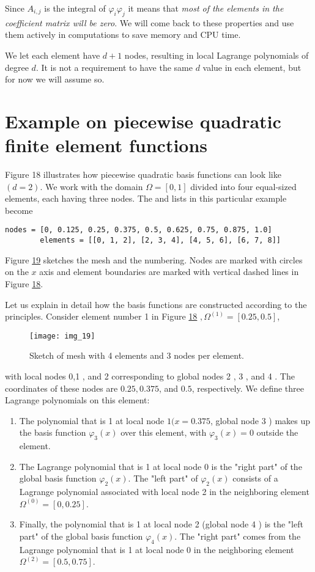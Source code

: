 \documentclass[../main.tex]{subfiles}
\begin{document}
	\noindent Since $A_{i, j}$ is the integral of $\varphi_{i} \varphi_{j}$ it means that \textit{most of the elements in the coefficient matrix will be zero}. We will come back to these properties and use them actively in computations to save memory and CPU time.
	
	We let each element have $d+1$ nodes, resulting in local Lagrange polynomials of degree $d$. It is not a requirement to have the same $d$ value in each element, but for now we will assume so.
	\section[Example on piecewise quadratic finite element functions]{Example on piecewise quadratic finite element functions}
	\label{sec:sec_3_3}
	\noindent Figure 18 illustrates how piecewise quadratic basis functions can look like $(d=2)$. We work with the domain $\Omega=[0,1]$ divided into four equal-sized elements, each having three nodes. The  and  lists in this particular example become
	\begin{lstlisting}[numbers=none]
		nodes = [0, 0.125, 0.25, 0.375, 0.5, 0.625, 0.75, 0.875, 1.0]
		elements = [[0, 1, 2], [2, 3, 4], [4, 5, 6], [6, 7, 8]]	
	\end{lstlisting}
	Figure \hyperref[fig:img_19]{19} sketches the mesh and the numbering. Nodes are marked with circles on the $x$ axis and element boundaries are marked with vertical dashed lines in Figure \hyperref[fig:img_18]{18}.
	
	Let us explain in detail how the basis functions are constructed according to the principles. Consider element number 1 in Figure \hyperref[fig:img_18]{18} $, \Omega^{(1)}=[0.25,0.5]$,
	\begin{figure}[H]
		\centering
		\texttt{[image: img\_19]}
		\caption{Sketch of mesh with 4 elements and 3 nodes per element.}
		\label{fig:img_19}
	\end{figure}
	\noindent with local nodes 0,1 , and 2 corresponding to global nodes 2 , 3 , and 4 . The coordinates of these nodes are $0.25,0.375$, and $0.5$, respectively. We define three Lagrange polynomials on this element:
	\begin{enumerate}
		\item The polynomial that is 1 at local node $1(x=0.375$, global node 3 ) makes up the basis function $\varphi_{3}(x)$ over this element, with $\varphi_{3}(x)=0$ outside the element.
		\item The Lagrange polynomial that is 1 at local node 0 is the "right part" of the global basis function $\varphi_{2}(x)$. The "left part" of $\varphi_{2}(x)$ consists of a Lagrange polynomial associated with local node 2 in the neighboring element $\Omega^{(0)}=[0,0.25]$.
		\item Finally, the polynomial that is 1 at local node 2 (global node 4 ) is the "left part" of the global basis function $\varphi_{4}(x)$. The "right part" comes from the Lagrange polynomial that is 1 at local node 0 in the neighboring element $\Omega^{(2)}=[0.5,0.75]$.
	\end{enumerate}	
	
\end{document}
